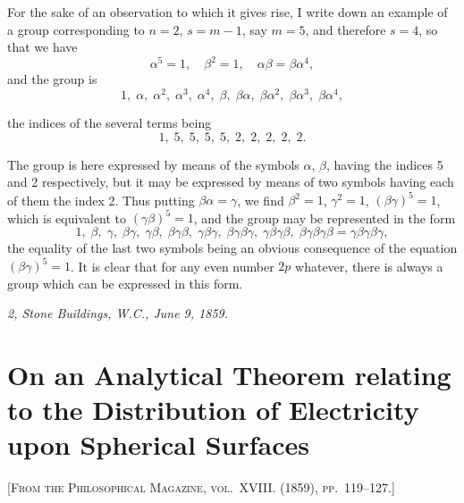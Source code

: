 \documentclass[11pt,a4paper]{article}
\begin{document}
For the sake of an observation to which it gives rise, I write down an example of a group corresponding to $n = 2$, $s = m-1$, say $m = 5$, and therefore $s = 4$, so that we have
\[
\alpha^{5} = 1,\quad \beta^{2} = 1,\quad \alpha\beta = \beta\alpha^{4},
\]
and the group is
\[
1,\; \alpha,\; \alpha^{2},\; \alpha^{3},\; \alpha^{4},\; \beta,\; \beta\alpha,\; \beta\alpha^{2},\; \beta\alpha^{3},\; \beta\alpha^{4},
\]

\setcounter{page}{91}

the indices of the several terms being
\[
1,\; 5,\; 5,\; 5,\; 5,\; 2,\; 2,\; 2,\; 2,\; 2.
\]

The group is here expressed by means of the symbols $\alpha$, $\beta$, having the indices 5 and 2 respectively, but it may be expressed by means of two symbols having each of them the index 2. Thus putting $\beta\alpha = \gamma$, we find $\beta^{2} = 1$, $\gamma^{2} = 1$, $(\beta\gamma)^{5} = 1$, which is equivalent to $(\gamma\beta)^{5} = 1$, and the group may be represented in the form
\[
1,\; \beta,\; \gamma,\; \beta\gamma,\; \gamma\beta,\; \beta\gamma\beta,\; \gamma\beta\gamma,\; \beta\gamma\beta\gamma,\; \gamma\beta\gamma\beta,\; \beta\gamma\beta\gamma\beta = \gamma\beta\gamma\beta\gamma,
\]
the equality of the last two symbols being an obvious consequence of the equation $(\beta\gamma)^{5} = 1$. It is clear that for any even number $2p$ whatever, there is always a group which can be expressed in this form.

\medskip
\noindent\textit{2, Stone Buildings, W.C., June 9, 1859.}

\newpage


\section{On an Analytical Theorem relating to the Distribution of Electricity upon Spherical Surfaces}
\label{paper:244}

\textsc{[From the Philosophical Magazine, vol.~XVIII. (1859), pp.~119--127.]}

\setcounter{page}{92}
\end{document}

